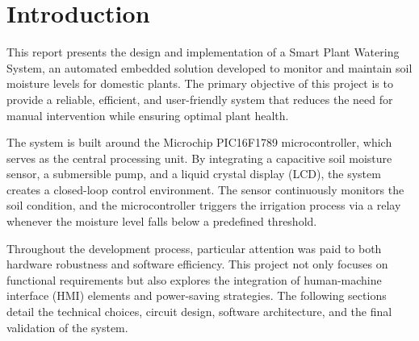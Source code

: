 \section{Introduction}
This report presents the design and implementation of a Smart Plant Watering System, an automated embedded solution developed to monitor and maintain soil moisture levels for domestic plants. The primary objective of this project is to provide a reliable, efficient, and user-friendly system that reduces the need for manual intervention while ensuring optimal plant health.

The system is built around the Microchip PIC16F1789 microcontroller, which serves as the central processing unit. By integrating a capacitive soil moisture sensor, a submersible pump, and a liquid crystal display (LCD), the system creates a closed-loop control environment. The sensor continuously monitors the soil condition, and the microcontroller triggers the irrigation process via a relay whenever the moisture level falls below a predefined threshold.

Throughout the development process, particular attention was paid to both hardware robustness and software efficiency. This project not only focuses on functional requirements but also explores the integration of human-machine interface (HMI) elements and power-saving strategies. The following sections detail the technical choices, circuit design, software architecture, and the final validation of the system.

